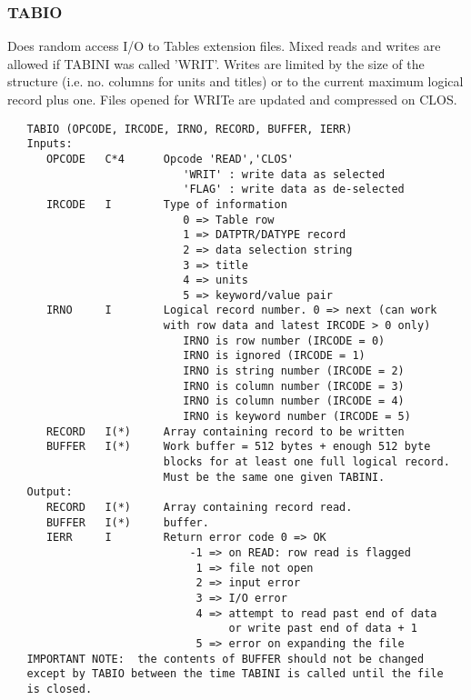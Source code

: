 \subsubsection{TABIO}
Does random access I/O to Tables extension files.  Mixed
reads and writes are allowed if TABINI was called 'WRIT'.  Writes
are limited by the size of the structure (i.e. no. columns for units
and titles) or to the current maximum logical record plus one.
Files opened for WRITe are updated and compressed on CLOS.
\begin{verbatim}
   TABIO (OPCODE, IRCODE, IRNO, RECORD, BUFFER, IERR)
   Inputs:
      OPCODE   C*4      Opcode 'READ','CLOS'
                           'WRIT' : write data as selected
                           'FLAG' : write data as de-selected
      IRCODE   I        Type of information
                           0 => Table row
                           1 => DATPTR/DATYPE record
                           2 => data selection string
                           3 => title
                           4 => units
                           5 => keyword/value pair
      IRNO     I        Logical record number. 0 => next (can work
                        with row data and latest IRCODE > 0 only)
                           IRNO is row number (IRCODE = 0)
                           IRNO is ignored (IRCODE = 1)
                           IRNO is string number (IRCODE = 2)
                           IRNO is column number (IRCODE = 3)
                           IRNO is column number (IRCODE = 4)
                           IRNO is keyword number (IRCODE = 5)
      RECORD   I(*)     Array containing record to be written
      BUFFER   I(*)     Work buffer = 512 bytes + enough 512 byte
                        blocks for at least one full logical record.
                        Must be the same one given TABINI.
   Output:
      RECORD   I(*)     Array containing record read.
      BUFFER   I(*)     buffer.
      IERR     I        Return error code 0 => OK
                            -1 => on READ: row read is flagged
                             1 => file not open
                             2 => input error
                             3 => I/O error
                             4 => attempt to read past end of data
                                  or write past end of data + 1
                             5 => error on expanding the file
   IMPORTANT NOTE:  the contents of BUFFER should not be changed
   except by TABIO between the time TABINI is called until the file
   is closed.
\end{verbatim}

